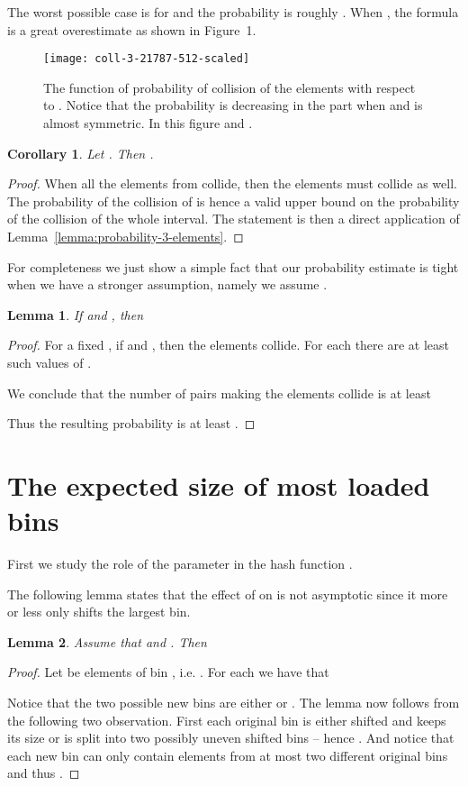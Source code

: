 \documentclass{article}
\newtheorem{lemma}{Lemma}
\newtheorem{corollary}{Corollary}
\begin{document}
The worst possible case is for  and the probability is roughly . 
When , the formula is a great overestimate as shown in Figure~1.

\begin{figure}[h]
	\label{fig:probability-3}
	\centering
	\texttt{[image: coll-3-21787-512-scaled]}
	\caption{The function of probability of collision of the elements  with respect to . Notice that the probability is decreasing in the part when  and is almost symmetric. In this figure  and .}
\end{figure}

\begin{corollary}
\label{co:d-elements}
Let . Then .
\end{corollary}
\begin{proof}
When all the elements from  collide, then the elements  must collide as well. The probability of the collision of  is hence a valid upper bound on the probability of the collision of the whole interval. The statement is then a direct application of Lemma~\ref{lemma:probability-3-elements}.
\end{proof}

For completeness we just show a simple fact that our probability estimate is tight when we have a stronger assumption, namely we assume .

\begin{lemma}
\label{lm:0-d-prob-lower-bound}
If  and , then 
\end{lemma}
\begin{proof}
For a fixed , if  and , then the elements  collide.
For each  there are at least  such values of .

We conclude that the number of pairs  making the elements collide is at least


Thus the resulting probability is at least .
\end{proof}

\section{The expected size of most loaded bins}

First we study the role of the parameter  in the hash function .

The following lemma states that the effect of  on  is not asymptotic since it more or less only shifts the largest bin.
\begin{lemma}
\label{lm:b-zero}
Assume that   and . Then 
\end{lemma}
\begin{proof}
Let  be elements of bin , i.e. .
For each  we have that 


Notice that the two possible new bins are either  or .
The lemma now follows from the following two observation.
First each original bin is either shifted and keeps its size or is split into two possibly uneven shifted bins -- hence .
And notice that each new bin can only contain elements from at most two different original bins and thus .
\end{proof}
\end{document}
